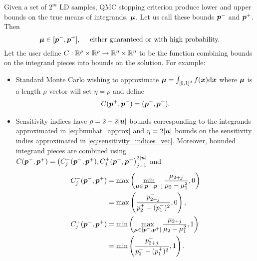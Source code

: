 \documentclass{article}
\begin{document}
Given a set of $2^m$ LD samples, QMC stopping criterion produce lower and upper bounds on the true means of integrands, $\boldsymbol{\mu}$. Let us call these bounds $\boldsymbol{p}^-$ and $\boldsymbol{p}^+$. Then 
\begin{equation}
    \boldsymbol{\mu} \in [\boldsymbol{p}^-,\boldsymbol{p}^+], \quad \text{ either guaranteed or with high probability.}
\end{equation}
Let the user define $C: \mathbb{R}^\rho \times \mathbb{R}^\rho \to \mathbb{R}^\eta \times \mathbb{R}^\eta$ to be the function combining bounds on the integrand pieces into bounds on the solution. For example:
\begin{itemize}
    \item Standard Monte Carlo wishing to approximate $\boldsymbol{\mu} = \int_{[0,1]^d} f(\boldsymbol{x})\mathrm{d}\boldsymbol{x}$ where $\boldsymbol{\mu}$ is a length $\rho$ vector will set $\eta = \rho$ and define 
    \begin{align}
        C(\boldsymbol{p}^+,\boldsymbol{p}^-) = (\boldsymbol{p}^+,\boldsymbol{p}^-).
    \end{align}
    \item Sensitivity indices have $\rho=2+2\lvert \boldsymbol{u} \rvert$ bounds corresponding to the integrands approximated in \eqref{eq:bmuhat_approx} and $\eta=2\lvert \boldsymbol{u} \rvert$ bounds on the sensitivity indies approximated in \eqref{eq:sensitivity_indices_vec}. Moreover, bounded integrand pieces are combined using $C(\boldsymbol{p}^-,\boldsymbol{p}^+) = \left(C_j^-(\boldsymbol{p}^-,\boldsymbol{p}^+), C_j^+(\boldsymbol{p}^-,\boldsymbol{p}^+\right)_{j=1}^{2\lvert \boldsymbol{u} \rvert}$ and
    \begin{subequations}
    \label{eq:combine_sensitivities}
    \begin{align} 
        C_j^-(\boldsymbol{p}^-,\boldsymbol{p}^+) 
        &= \max\left(\min_{\boldsymbol{\mu} \in [\boldsymbol{p}^-,\boldsymbol{p}^+]} \frac{\mu_{2+j}}{\mu_2-\mu_1^2}, 0 \right) \\
        &= \max\left(\frac{p_{2+j}^-}{p_2^+-(p_1^-)^2}, 0\right), \\
        C_j^+(\boldsymbol{p}^-,\boldsymbol{p}^+) 
        &= \min\left(\max_{\boldsymbol{\mu} \in [\boldsymbol{p}^-,\boldsymbol{p}^+]} \frac{\mu_{2+j}}{\mu_2-\mu_1^2}, 1\right) \\
        & = \min\left(\frac{p_{2+j}^+}{p_2^- - (p_1^+)^2}, 1\right).
    \end{align}
    \end{subequations}
\end{itemize}
\end{document}
